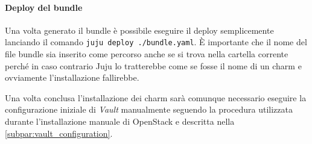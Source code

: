 \paragraph{Deploy del bundle} Una volta generato il bundle è possibile eseguire il deploy semplicemente lanciando il comando \verb|juju deploy ./bundle.yaml|.
È importante che il nome del file bundle sia inserito come percorso anche se si trova nella cartella corrente perché in caso contrario Juju lo tratterebbe come se fosse il nome di un charm e ovviamente l'installazione fallirebbe.

Una volta conclusa l'installazione dei charm sarà comunque necessario eseguire la configurazione iniziale di \emph{Vault} manualmente seguendo la procedura utilizzata durante l'installazione manuale di OpenStack e descritta nella \cref{subpar:vault_configuration}.